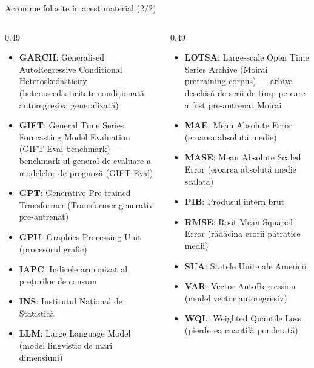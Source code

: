 \begin{frame}{Acronime folosite în acest material (2/2)}
\begin{columns}[T]
\begin{column}{0.49\textwidth}
\begin{itemize}\setlength{\itemsep}{0pt}
    \item \textbf{GARCH}: Generalised AutoRegressive Conditional Heteroskedasticity (heteroscedasticitate condiționată autoregresivă generalizată)
    \item \textbf{GIFT}: General Time Series Forecasting Model Evaluation (GIFT-Eval benchmark) — benchmark-ul general de evaluare a modelelor de prognoză (GIFT-Eval)
    \item \textbf{GPT}: Generative Pre-trained Transformer (Transformer generativ pre-antrenat)
    \item \textbf{GPU}: Graphics Processing Unit (procesorul grafic)
    \item \textbf{IAPC}: Indicele armonizat al prețurilor de consum
    \item \textbf{INS}: Institutul Național de Statistică
    \item \textbf{LLM}: Large Language Model (model lingvistic de mari dimensiuni)
\end{itemize}
\end{column}
\begin{column}{0.49\textwidth}
\begin{itemize}\setlength{\itemsep}{0pt}
    \item \textbf{LOTSA}: Large-scale Open Time Series Archive (Moirai pretraining corpus) — arhiva deschisă de serii de timp pe care a fost pre-antrenat Moirai
    \item \textbf{MAE}: Mean Absolute Error (eroarea absolută medie)
    \item \textbf{MASE}: Mean Absolute Scaled Error (eroarea absolută medie scalată)
    \item \textbf{PIB}: Produsul intern brut
    \item \textbf{RMSE}: Root Mean Squared Error (rădăcina erorii pătratice medii)
    \item \textbf{SUA}: Statele Unite ale Americii
    \item \textbf{VAR}: Vector AutoRegression (model vector autoregresiv)
    \item \textbf{WQL}: Weighted Quantile Loss (pierderea cuantilă ponderată)
\end{itemize}
\end{column}
\end{columns}
\end{frame}

